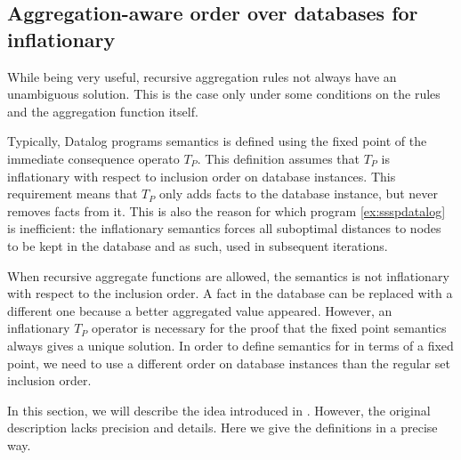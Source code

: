 \begin{figure}[!htbp]
\end{figure}


\subsection{Aggregation-aware order over databases for inflationary \datalogra}
While being very useful, recursive aggregation rules not always have an unambiguous solution. This is the case only under some conditions on the rules and the aggregation function itself.

Typically, Datalog programs semantics is defined using the fixed point of the immediate consequence operato $T_P$. This definition assumes that $T_P$ is inflationary with respect to inclusion order on database instances. This requirement means that $T_P$ only adds facts to the database instance, but never removes facts from it. This is also the reason for which program \ref{ex:ssspdatalog} is inefficient: the inflationary semantics forces all suboptimal distances to nodes to be kept in the database and as such, used in subsequent iterations.

When recursive aggregate functions are allowed, the semantics is not inflationary with respect to the inclusion order. A fact in the database can be replaced with a different one because a better aggregated value appeared. However, an inflationary $T_P$ operator is necessary for the proof that the fixed point semantics always gives a unique solution. In order to define semantics for \datalogra in terms of a fixed point, we need to use a different order on database instances than the regular set inclusion order.

In this section, we will describe the idea introduced in \cite{socialite}. However, the original description lacks precision and details. Here we give the definitions in a precise way.

